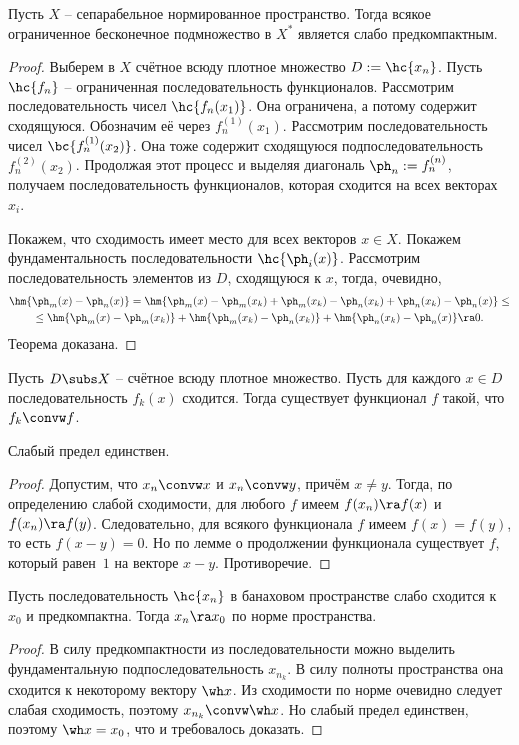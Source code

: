 \documentclass[a4paper]{article}
\newcommand{\n}[1]{^{(#1)}}
\begin{document}
\begin{theorem}
Пусть $X$ -- сепарабельное нормированное пространство. Тогда всякое ограниченное
бесконечное подмножество в $X^*$ является слабо предкомпактным.
\end{theorem}
\begin{proof}
Выберем в $X$ счётное всюду плотное множество $D := \hc{x_n}$. Пусть $\hc{f_n}$ -- ограниченная
последовательность функционалов. Рассмотрим последовательность чисел $\hc{f_n(x_1)}$. Она ограничена,
а потому содержит сходящуюся. Обозначим её через $f_n\n1(x_1)$. Рассмотрим последовательность чисел
$\bc{f_n\n1(x_2)}$. Она тоже содержит сходящуюся подпоследовательность $f_n\n2(x_2)$.
Продолжая этот процесс и выделяя диагональ $\ph_n := f_n\n n$, получаем последовательность функционалов,
которая сходится на всех векторах $x_i$.

Покажем, что сходимость имеет место для всех векторов $x \in X$. Покажем фундаментальность
последовательности $\hc{\ph_i(x)}$.
Рассмотрим последовательность элементов из $D$, сходящуюся к $x$, тогда, очевидно,
\begin{multline*}
\hm{\ph_m(x) - \ph_n(x)} = \hm{\ph_m(x) - \ph_m(x_k) + \ph_m(x_k) - \ph_n(x_k) + \ph_n(x_k) - \ph_n(x)} \le\\\le
\hm{\ph_m(x) - \ph_m(x_k)} + \hm{\ph_m(x_k) - \ph_n(x_k)} + \hm{\ph_n(x_k) - \ph_n(x)} \ra 0.
\end{multline*}
Теорема доказана.
\end{proof}

\begin{imp}
Пусть $D \subs X$ -- счётное всюду плотное множество.
Пусть для каждого $x \in D$ последовательность $f_k(x)$ сходится. Тогда существует
функционал $f$ такой, что $f_k \convw f$.
\end{imp}

\begin{stm}
Слабый предел единствен.
\end{stm}
\begin{proof}
Допустим, что $x_n \convw x$ и $x_n \convw y$, причём $x \neq y$. Тогда, по определению
слабой сходимости, для любого $f$ имеем $f(x_n) \ra f(x)$ и $f(x_n) \ra f(y)$. Следовательно,
для всякого функционала $f$ имеем $f(x) = f(y)$, то есть $f(x-y) = 0$.
Но по лемме о продолжении функционала существует $f$, который равен~$1$ на  векторе $x-y$.
Противоречие.
\end{proof}

\begin{lemma}
Пусть последовательность $\hc{x_n}$ в банаховом пространстве
слабо сходится к $x_0$ и предкомпактна. Тогда $x_n \ra x_0$ по норме пространства.
\end{lemma}
\begin{proof}
В силу предкомпактности из последовательности можно выделить фундаментальную подпоследовательность $x_{n_k}$.
В силу полноты пространства она сходится к некоторому вектору $\wh x$. Из сходимости
по норме очевидно следует слабая сходимость, поэтому $x_{n_k} \convw \wh x$.
Но слабый предел единствен, поэтому $\wh x = x_0$, что и требовалось доказать.
\end{proof}
\end{document}
